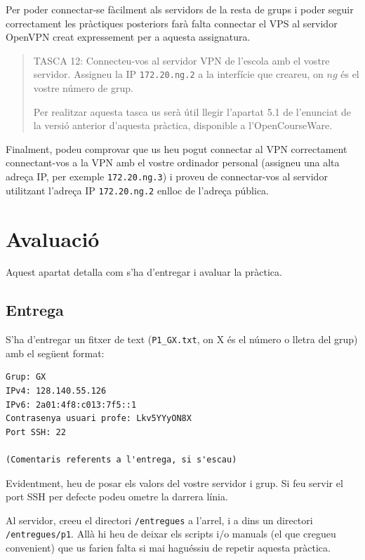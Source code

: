 \documentclass{practicaitic}
\begin{document}
Per poder connectar-se fàcilment als servidors de la resta de grups i poder seguir
correctament les pràctiques posteriors farà falta connectar el VPS al servidor
OpenVPN creat expressement per a aquesta assignatura.

\begin{quote}
  TASCA 12: Connecteu-vos al servidor VPN de l'escola amb el vostre servidor.
  Assigneu la IP \texttt{172.20.ng.2} a la interfície que creareu, on $ng$ és
  el vostre número de grup.

  Per realitzar aquesta tasca us serà útil llegir l'apartat 5.1 de l'enunciat de
  la versió anterior d'aquesta pràctica, disponible a l'OpenCourseWare.
\end{quote}

Finalment, podeu comprovar que us heu pogut connectar al VPN correctament
connectant-vos a la VPN amb el vostre ordinador personal (assigneu una alta
adreça IP, per exemple \texttt{172.20.ng.3}) i proveu de connectar-vos al servidor
utilitzant l'adreça IP \texttt{172.20.ng.2} enlloc de l'adreça pública.

\section{Avaluació}

Aquest apartat detalla com s'ha d'entregar i avaluar la pràctica.

\subsection{Entrega}
\label{sec:entrega}

S'ha d'entregar un fitxer de text (\texttt{P1\_GX.txt}, on X és el número o 
lletra del grup) amb el següent format:

\begin{verbatim}
Grup: GX
IPv4: 128.140.55.126
IPv6: 2a01:4f8:c013:7f5::1
Contrasenya usuari profe: Lkv5YYyON8X
Port SSH: 22

(Comentaris referents a l'entrega, si s'escau)
\end{verbatim}

Evidentment, heu de posar els valors del vostre servidor i grup. Si feu
servir el port SSH per defecte podeu ometre la darrera línia.

Al servidor, creeu el directori \texttt{/entregues} a l'arrel, i a dins un
directori \texttt{/entregues/p1}. Allà hi heu de deixar els scripts i/o manuals
(el que cregueu convenient) que us farien falta si mai haguéssiu de repetir
aquesta pràctica.
\end{document}
